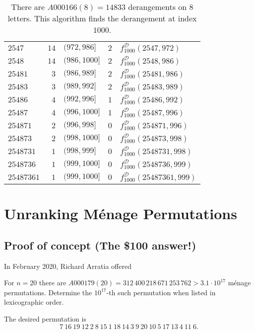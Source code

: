\begin{table}
\begin{tabular}{|l|r|l|c|l|}
  $2547    $ & $14$   & $(972, 986]$      & $2$ & $f^{\mathcal{D}}_{1000}(2547, 972)$     \\
  $2548    $ & $14$   & $(986, 1000]$     & $2$ & $f^{\mathcal{D}}_{1000}(2548, 986)$     \\
  \hline
  $25481   $ & $3$    & $(986, 989]$      & $2$ & $f^{\mathcal{D}}_{1000}(25481, 986)$    \\
  $25483   $ & $3$    & $(989, 992]$      & $2$ & $f^{\mathcal{D}}_{1000}(25483, 989)$    \\
  $25486   $ & $4$    & $(992, 996]$      & $1$ & $f^{\mathcal{D}}_{1000}(25486, 992)$    \\
  $25487   $ & $4$    & $(996, 1000]$     & $1$ & $f^{\mathcal{D}}_{1000}(25487, 996)$    \\
  \hline
  $254871   $ & $2$   & $(996, 998]$      & $0$ & $f^{\mathcal{D}}_{1000}(254871, 996)$   \\
  $254873   $ & $2$   & $(998, 1000]$     & $0$ & $f^{\mathcal{D}}_{1000}(254873, 998)$   \\
  \hline
  $2548731  $ & $1$   & $(998, 999]$      & $0$ & $f^{\mathcal{D}}_{1000}(2548731, 998)$  \\
  $2548736  $ & $1$   & $(999, 1000]$     & $0$ & $f^{\mathcal{D}}_{1000}(2548736, 999)$  \\
  \hline
  $25487361 $ & $1$   & $(999, 1000]$     & $0$ & $f^{\mathcal{D}}_{1000}(25487361, 999)$ \\
  \hline
\end{tabular}
\caption[Steps for computing the $1000$th derangement in $S_8$]{
  There are $A000166(8) = 14833$ derangements on $8$ letters.
  This algorithm finds the derangement at index $1000$.
}
\end{table}

\section{Unranking M\'enage Permutations}

\subsection{Proof of concept (The \$100 answer!)}
In February 2020, Richard Arratia offered
\begin{problem}
  For $n=20$ there are $A000179(20) = 312\,400\,218\,671\,253\,762 > 3.1\cdot 10^{17}$
  m\'enage permutations.
  Determine the $10^{17}$-th such permutation when listed in lexicographic order.
\end{problem}
\begin{answer}
  The desired permutation is \begin{equation}
    7\ 16\ 19\ 12\ 2\ 8\ 15\ 1\ 18\ 14\ 3\ 9\ 20\ 10\ 5\ 17\ 13\ 4\ 11\ 6.
  \end{equation}
\end{answer}

